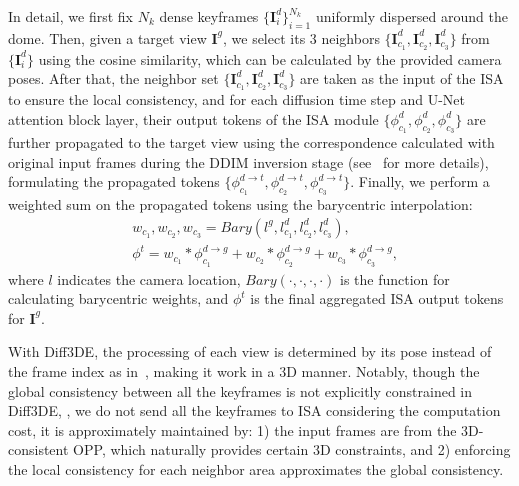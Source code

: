 In detail, we first fix $N_k$ dense keyframes $\{\textbf{I}_i^{d} \}_{i=1}^{N_k}$ uniformly dispersed around the dome. Then, given a target view $\textbf{I}^{g}$, we select its $3$ neighbors $\{ \textbf{I}_{c_1}^{d}, \textbf{I}_{c_2}^{d}, \textbf{I}_{c_3}^{d}\}$ from $\{ \textbf{I}_i^{d}\}$ using the cosine similarity, which can be calculated by the provided camera poses. After that, the neighbor set $\{ \textbf{I}_{c_1}^{d}, \textbf{I}_{c_2}^{d}, \textbf{I}_{c_3}^{d}\}$ are taken as the input of the ISA to ensure the local consistency, and for each diffusion time step and U-Net attention block layer, their output tokens of the ISA module $\{ \phi_{c_1}^{d}, \phi_{c_2}^{d}, \phi_{c_3}^{d}\}$  are further propagated to the target view using the correspondence calculated with original input frames during the DDIM inversion stage (see~\cite{geyer2023tokenflow} for more details), formulating the propagated tokens $\{\phi_{c_1}^{d \rightarrow t},\phi_{c_2}^{d \rightarrow t}, \phi_{c_3}^{d \rightarrow t}\}$. Finally, we perform a weighted sum on  the propagated tokens using the barycentric interpolation:
\begin{equation}
\begin{aligned}
   &  w_{c_1}, w_{c_2}, w_{c_3} = Bary(l^{g}, l^{d}_{c_1}, l^{d}_{c_2}, l^{d}_{c_3}), \\
    & \phi^{t} = w_{c_1} * \phi_{c_1}^{d \rightarrow g} + w_{c_2} * \phi_{c_2}^{d \rightarrow g} + w_{c_3} * \phi_{c_3}^{d \rightarrow g}  ,
\end{aligned}
\end{equation}
where $l$ indicates the camera location, $Bary(\cdot,\cdot,\cdot,\cdot)$ is the function for calculating barycentric weights, and $\phi^t$ is the final aggregated ISA output tokens for $\textbf{I}^{g}$.



With Diff3DE, the processing of each view is determined by its pose instead of the frame index as in~\cite{geyer2023tokenflow}, making it work in a 3D manner. Notably, though the global consistency between all the keyframes is not explicitly constrained in Diff3DE, \ie, we do not send all the keyframes to ISA considering the computation cost, it is approximately maintained by: 1) the input frames are from the 3D-consistent OPP, which naturally provides certain 3D constraints, and 2) enforcing the local consistency for each neighbor area approximates the global consistency.
